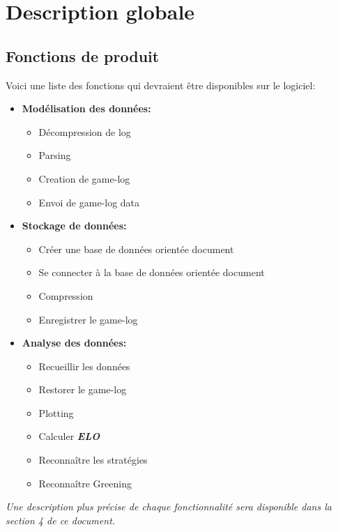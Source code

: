 \documentclass{scrreprt}
\begin{document}
\chapter{Description globale}


\section{Fonctions de produit}

Voici une liste des fonctions qui devraient être disponibles sur le logiciel:
\begin{itemize}


  \item{\textbf{Modélisation des données:}}
    \begin{itemize}
    \item{Décompression de log}
    \item{Parsing}
    \item{Creation de game-log}
    \item{Envoi de game-log data}
    \end{itemize}
  \item{\textbf{Stockage de données:}}
    \begin{itemize}
    \item{Créer une base de données orientée document}
    \item{Se connecter à la base de données orientée document}
    \item{Compression}
    \item{Enregistrer le game-log}
    \end{itemize}
  \item{\textbf{Analyse des données:}}
    \begin{itemize}
      \item{Recueillir les données}
      \item{Restorer le game-log}
      \item{Plotting}
      \item{Calculer \textit{\textbf{ELO}}}
      \item{Reconnaître les stratégies}
      \item{Reconnaître Greening}
    \end{itemize}
\end{itemize}
\textit{ Une description plus précise de chaque fonctionnalité sera disponible dans la section 4 de ce document. }
\end{document}
